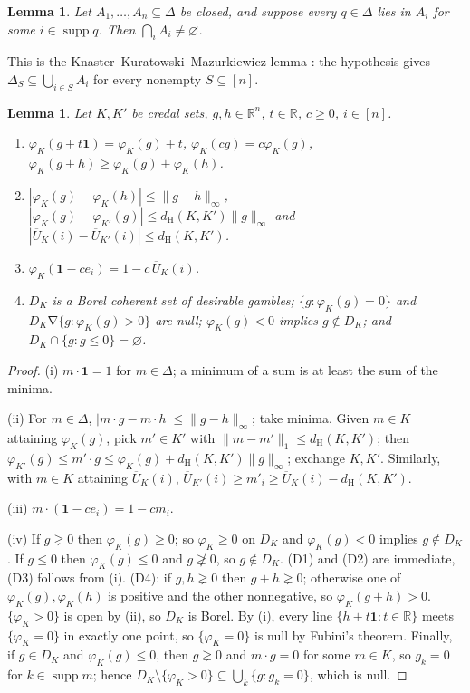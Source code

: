 \documentclass[11pt]{article}
\newtheorem{lemma}[theorem]{Lemma}
\theoremstyle{definition}
\newcommand{\R}{\mathbb R}
\newcommand{\one}{\mathbf 1}
\newcommand{\supp}{\operatorname{supp}}
\newcommand{\dH}{d_{\mathrm H}}
\newcommand{\Ub}{\overline U}
\newcommand{\sd}{\mathbin{\nabla}}
\begin{document}
\begin{lemma}\label{lem:kkm}
Let $A_1,\dots,A_n\subseteq\Delta$ be closed, and suppose every $q\in\Delta$ lies in $A_i$ for some $i\in\supp q$. Then $\bigcap_iA_i\ne\varnothing$.
\end{lemma}

This is the Knaster--Kuratowski--Mazurkiewicz lemma \cite{KKM}: the hypothesis gives $\Delta_S\subseteq\bigcup_{i\in S}A_i$ for every nonempty $S\subseteq[n]$.

\begin{lemma}\label{lem:basic}
Let $K,K'$ be credal sets, $g,h\in\R^n$, $t\in\R$, $c\ge0$, $i\in[n]$.
\begin{enumerate}[label=(\roman*)]
\item $\varphi_K(g+t\one)=\varphi_K(g)+t$, $\varphi_K(cg)=c\varphi_K(g)$, $\varphi_K(g+h)\ge\varphi_K(g)+\varphi_K(h)$.
\item $|\varphi_K(g)-\varphi_K(h)|\le\|g-h\|_\infty$, $|\varphi_K(g)-\varphi_{K'}(g)|\le\dH(K,K')\|g\|_\infty$ and $|\Ub_K(i)-\Ub_{K'}(i)|\le\dH(K,K')$.
\item $\varphi_K(\one-ce_i)=1-c\,\Ub_K(i)$.
\item $D_K$ is a Borel coherent set of desirable gambles; $\{g:\varphi_K(g)=0\}$ and $D_K\sd\{g:\varphi_K(g)>0\}$ are null; $\varphi_K(g)<0$ implies $g\notin D_K$; and $D_K\cap\{g:g\le0\}=\varnothing$.
\end{enumerate}
\end{lemma}

\begin{proof}
(i) $m\cdot\one=1$ for $m\in\Delta$; a minimum of a sum is at least the sum of the minima.

(ii) For $m\in\Delta$, $|m\cdot g-m\cdot h|\le\|g-h\|_\infty$; take minima. Given $m\in K$ attaining $\varphi_K(g)$, pick $m'\in K'$ with $\|m-m'\|_1\le\dH(K,K')$; then $\varphi_{K'}(g)\le m'\cdot g\le\varphi_K(g)+\dH(K,K')\|g\|_\infty$; exchange $K,K'$. Similarly, with $m\in K$ attaining $\Ub_K(i)$, $\Ub_{K'}(i)\ge m'_i\ge\Ub_K(i)-\dH(K,K')$.

(iii) $m\cdot(\one-ce_i)=1-cm_i$.

(iv) If $g\gneq0$ then $\varphi_K(g)\ge0$; so $\varphi_K\ge0$ on $D_K$ and $\varphi_K(g)<0$ implies $g\notin D_K$. If $g\le0$ then $\varphi_K(g)\le0$ and $g\not\gneq0$, so $g\notin D_K$. (D1) and (D2) are immediate, (D3) follows from (i). (D4): if $g,h\gneq0$ then $g+h\gneq0$; otherwise one of $\varphi_K(g),\varphi_K(h)$ is positive and the other nonnegative, so $\varphi_K(g+h)>0$. $\{\varphi_K>0\}$ is open by (ii), so $D_K$ is Borel. By (i), every line $\{h+t\one:t\in\R\}$ meets $\{\varphi_K=0\}$ in exactly one point, so $\{\varphi_K=0\}$ is null by Fubini's theorem. Finally, if $g\in D_K$ and $\varphi_K(g)\le0$, then $g\gneq0$ and $m\cdot g=0$ for some $m\in K$, so $g_k=0$ for $k\in\supp m$; hence $D_K\setminus\{\varphi_K>0\}\subseteq\bigcup_k\{g:g_k=0\}$, which is null.
\end{proof}
\end{document}
